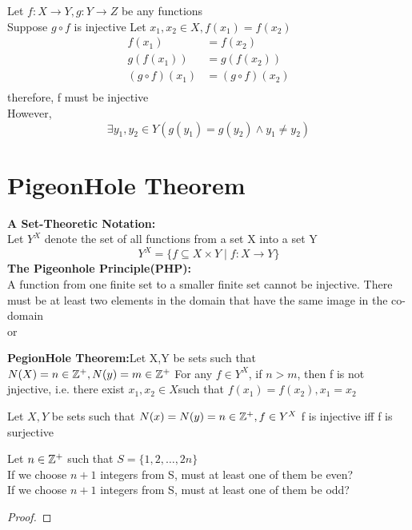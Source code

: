 \documentclass[a4paper]{article}
\begin{document}
\begin{remark}
    Let $f: X \rightarrow Y, g: Y\rightarrow Z$ be any functions\\
    Suppose $g \circ f$ is injective
    Let $x_1, x_2 \in X, f(x_1) = f(x_2)$\\
    \begin{align*}
        f(x_1) &= f(x_2)\\
        g(f(x_1)) &= g(f(x_2))\\
        (g \circ f)(x_1) &= (g \circ f)(x_2) \\
    \end{align*}
    therefore, f must be injective\\
    However,
    \[
    \exists y_1,y_2 \in Y(g(y_1) = g(y_2) \wedge y_1 \neq y_2)
    \]
\end{remark}


\section{PigeonHole Theorem}
\textbf{A Set-Theoretic Notation:}\\
Let $Y^X$ denote the set of all functions from a set X into a set Y
\[
Y^X = \{f \subseteq X \times Y \mid f:X \rightarrow Y\}
\]
\textbf{The Pigeonhole Principle(PHP):}\\
A function from one finite set to a smaller finite set cannot be injective. There must be at least two elements in the domain that have the same image in the co-domain\\
or
\begin{thm}
    \textbf{PegionHole Theorem:}Let X,Y be sets such that $N(X) = n \in \mathbb{Z}^+, N(y) = m \in \mathbb{Z}^+$ For any $f \in Y^X$, if $n > m$, then f is not jnjective, i.e. there exist $x_1,x_2 \in X$such that $f(x_1) = f(x_2) , x_1 = x_2 $  
\end{thm}

\begin{thm}
    Let $X,Y$ be sets such that $N(x) = N(y) = n \in \mathbb{Z}^+ , f \in Y^X$ f is injective iff f is surjective
\end{thm}
\begin{exercise}
    Let $n\in \mathbb{Z}^+$ such that $S = \{1,2,\ldots,2n\}$\\
    If we choose $n+1$ integers from S, must at least one of them be even?\\
    If we choose $n+1$ integers from S, must at least one of them be odd?
\end{exercise}
\begin{proof}
    
\end{proof}
\end{document}
